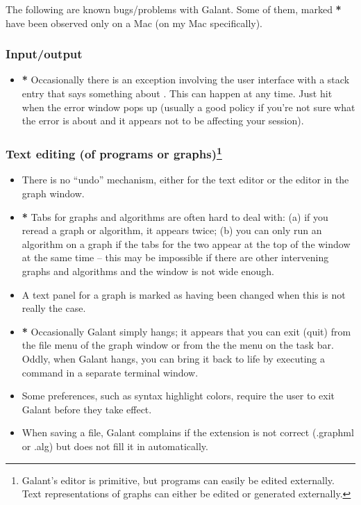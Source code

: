 The following are known bugs/problems with Galant. Some of them, marked
\textbf{*} have been observed only on a Mac (on my Mac specifically).

\subsubsection*{Input/output}

\begin{itemize}
  
\item \textbf{*} Occasionally there is an exception involving the user
  interface with a stack entry that says something about
  . This can happen at any time. Just hit 
  when the error window pops up (usually a good policy if you're not sure
  what the error is about and it appears not to be affecting your session).
\end{itemize}

\subsubsection*{Text editing (of programs or graphs)\footnote{
Galant's editor  is primitive, but
programs can easily be edited externally.
Text representations of graphs can either be edited or generated externally.}}

\begin{itemize}

\item There is no ``undo'' mechanism, either for the text editor or the
  editor in the graph window.

\item \textbf{*} Tabs for graphs and algorithms are often hard to deal with: (a) if you
  reread a graph or algorithm, it appears twice; (b) you can only run an
  algorithm on a graph if the tabs for the two appear at the top of the
  window at the same time -- this
  may be impossible if there are other intervening graphs and algorithms
  and the window is not wide enough.

\item A text panel for a graph is marked as having been changed when
  this is not really the case.

\item \textbf{*} Occasionally Galant simply hangs;
  it appears that you can exit (quit) from
  the file menu of the graph window or from the the  menu on the
  task bar.
  Oddly, when Galant hangs, you can bring it back to life by executing a
  command in a separate terminal window.

\item
  Some preferences, such as syntax highlight colors, require the user to exit
  Galant before they take effect.

\item
  When saving a file, Galant complains if the extension is not correct
  (\textsf{.graphml} or \textsf{.alg}) but does not fill it in automatically.

\end{itemize}

